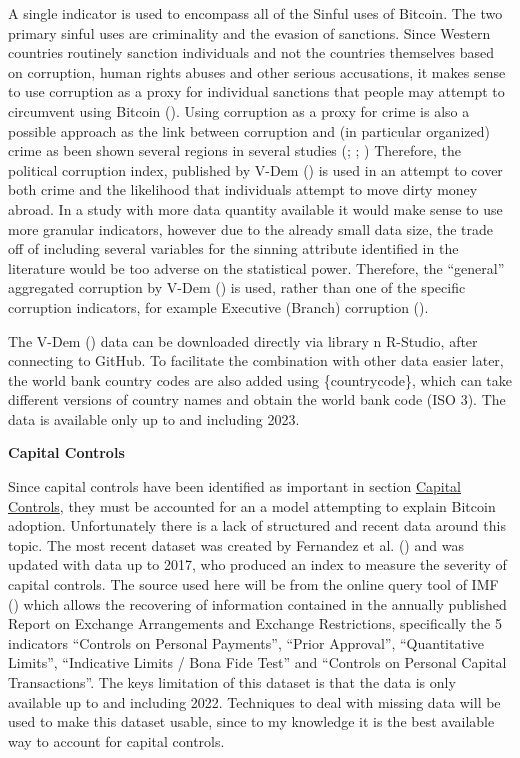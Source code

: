 \documentclass[
]{article}
\begin{document}
A single indicator is used to encompass all of the Sinful uses of Bitcoin. The two primary sinful uses are criminality and the evasion of sanctions. Since Western countries routinely sanction individuals and not the countries themselves based on corruption, human rights abuses and other serious accusations, it makes sense to use corruption as a proxy for individual sanctions that people may attempt to circumvent using Bitcoin (). Using corruption as a proxy for crime is also a possible approach as the link between corruption and (in particular organized) crime as been shown several regions in several studies (; ; ) Therefore, the political corruption index, published by V-Dem () is used in an attempt to cover both crime and the likelihood that individuals attempt to move dirty money abroad. In a study with more data quantity available it would make sense to use more granular indicators, however due to the already small data size, the trade off of including several variables for the sinning attribute identified in the literature would be too adverse on the statistical power. Therefore, the ``general'' aggregated corruption by V-Dem () is used, rather than one of the specific corruption indicators, for example Executive (Branch) corruption ().

The V-Dem () data can be downloaded directly via library n R-Studio, after connecting to GitHub. To facilitate the combination with other data easier later, the world bank country codes are also added using \{countrycode\}, which can take different versions of country names and obtain the world bank code (ISO 3). The data is available only up to and including 2023.

\textbf{Capital Controls}

Since capital controls have been identified as important in section \hyperref[capital-controls]{Capital Controls}, they must be accounted for an a model attempting to explain Bitcoin adoption. Unfortunately there is a lack of structured and recent data around this topic. The most recent dataset was created by Fernandez et al. () and was updated with data up to 2017, who produced an index to measure the severity of capital controls. The source used here will be from the online query tool of IMF () which allows the recovering of information contained in the annually published Report on Exchange Arrangements and Exchange Restrictions, specifically the 5 indicators ``Controls on Personal Payments'', ``Prior Approval'', ``Quantitative Limits'', ``Indicative Limits / Bona Fide Test'' and ``Controls on Personal Capital Transactions''. The keys limitation of this dataset is that the data is only available up to and including 2022. Techniques to deal with missing data will be used to make this dataset usable, since to my knowledge it is the best available way to account for capital controls.
\end{document}
